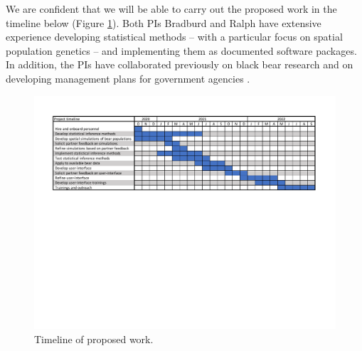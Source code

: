 \documentclass[12pt]{article}
\begin{document}
We are confident that we will be able to 
carry out the proposed work in the timeline below (Figure \ref{timeline}).
Both PIs Bradburd and Ralph have extensive 
experience developing statistical methods \citep{bedassle, SpaceMix, conStruct} -- 
with a particular focus on spatial population genetics \citep{Bradburd_Ralph_2019, Battey_etal_2020} -- 
and implementing them as documented software packages.
In addition, the PIs have collaborated previously 
on black bear research \citep{conStruct}
and on developing management plans 
for government agencies \citep{DesertTorts}. 


\begin{figure}[h!]
    \centering
         \includegraphics[width=\linewidth]{bear_gantt_chart.pdf}
        \caption{
		Timeline of proposed work.
        }
        \label{timeline}
\end{figure}

\clearpage

\end{document}
